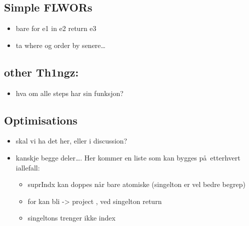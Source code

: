 \subsection{Simple FLWORs}
\label{sect:trans:TD:simpleFLWOR}
\begin{itemize}
  \item bare for e1 in e2 return e3
  \item ta where og order by senere\ldots
\end{itemize}

\subsection{other Th1ngz:}
\begin{itemize}
  \item hva om alle steps har sin funksjon?
\end{itemize}


\subsection{Optimisations}
\label{sect:trans:optimisations}
\begin{itemize}
  \item skal vi ha det her, eller i discussion?
  \item kanskje begge deler\ldots. Her kommer en liste som kan bygges p\aa~etterhvert iallefall:
	  \begin{itemize}
	    \item suprIndx kan doppes n\aa r bare atomiske (singelton er vel bedre begrep)
	    \item for kan bli -> project , ved singelton return
	    \item singeltons trenger ikke index
	  \end{itemize} 
\end{itemize}